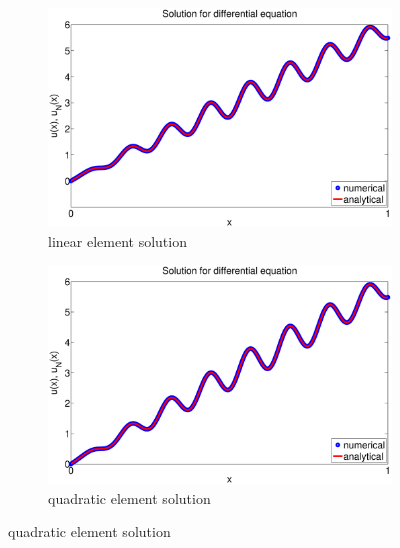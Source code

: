 \documentclass[paper=a4, fontsize=11pt]{article} %
\begin{document}
\begin{figure}
        \centering
        \begin{subfigure}[b]{\textwidth}
                \includegraphics[width=\textwidth]{solution_P1.eps}
                \caption{linear element solution}
                \label{fig:k2}
        \end{subfigure}%
        
        \begin{subfigure}[b]{\textwidth}
                \includegraphics[width=\textwidth]{solution_P2.eps}
                \caption{quadratic element solution}
                \label{fig:k4}
        \end{subfigure}
        

\end{figure}
\end{document}
